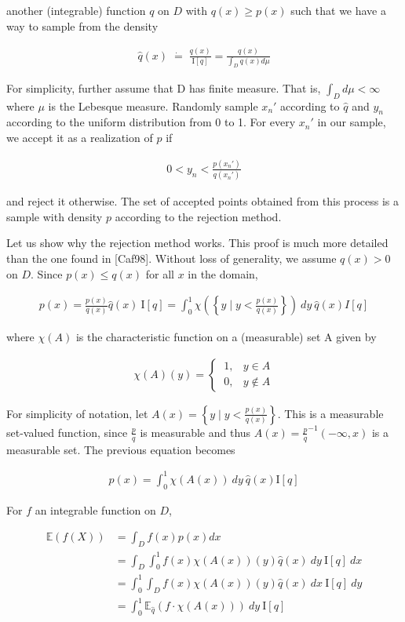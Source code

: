 \documentclass[12pt]{article}
\begin{document}
\noindent another (integrable) function $q$ on $D$ with $q(x) \geq p(x)$ such that we have a way to sample from the density

\begin{align*}
\hat{q}(x) \; \dot{=} \; \frac{q(x)}{\text{I}[q]}=\frac{q(x)}{\int_Dq(x)d\mu}
\end{align*}

\noindent For simplicity, further assume that D has finite measure. That is, $\int_Dd\mu<\infty$ where $\mu$ is the Lebesque measure. Randomly sample $x_n'$ according to $\hat{q}$ and $y_n$ according to the uniform distribution from 0 to 1. For every $x_n'$ in our sample, we accept it as a realization of $p$ if 

\begin{align*}
0<y_n<\frac{p(x_n')}{q(x_n')}
\end{align*}

\noindent and reject it otherwise. The set of accepted points obtained from this process is a sample with density $p$ according to the rejection method. 

\quad Let us show why the rejection method works. This proof is much more detailed than the one found in [Caf98]. Without loss of generality, we assume $q(x)>0$ on $D$. Since $p(x) \leq q(x)$ for all $x$ in the domain,

\begin{align*}
p(x) = \frac{p(x)}{q(x)}
\hat{q}(x)\:\text{I}[q]=\int_0^1\chi \left (\left \{y \mid y<\frac{p(x)}{q(x)} \right\} \right) \: dy \:\hat{q}(x)I[q]
\end{align*}

\noindent where $\chi(A)$ is the characteristic function on a (measurable) set A given by 

\begin{align*}
\chi(A)(y) =
    \begin{cases}
        \:1, & y \in A \\
        \:0, & y \notin A
    \end{cases}
\end{align*}

\noindent For simplicity of notation, let $A(x)=\left \{y \! \mid \!\! y<\frac{p(x)}{q(x)} \right \}$. This is a measurable set-valued function, since $\frac{p}{q}$ is measurable and thus $A(x)=\frac{p}{q}^{-1}(-\infty,x)$ is a measurable set. The previous equation becomes 

\begin{align*}
p(x)=\int_0^1\chi(A(x))\:dy\:\hat{q}(x)\text{I}[q]
\end{align*}

\noindent For $f$ an integrable function on $D$,

\begin{align*} 
\mathbb{E}(f(X))&=\int_Df(x)p(x)dx \nonumber \\
    &=\int_D\int_0^1f(x)\chi(A(x))(y)\hat{q}(x)\:dy\:\text{I}[q]\:dx \tag{4.14}\\ 
    &=\int_0^1 \int_Df(x)\chi(A(x))(y)\hat{q}(x)\:dx\:\text{I}[q]\:dy \nonumber \\
    &=\int_0^1 \mathbb{E}_{\hat{q}}(f\cdot\chi(A(x)))\: dy \:\text{I}[q] \nonumber
\end{align*}
\end{document}
